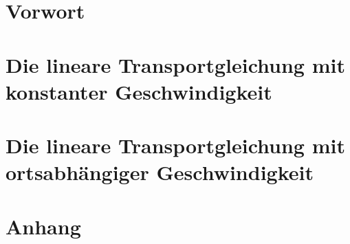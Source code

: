 \documentclass[a4paper
               ,11pt%
               ,openright%
               ,titlepage%
               ,twoside%
               ]{scrreprt}
\numberwithin{equation}{section}
\begin{document}

\pagestyle{empty}
\clearpage{}



\tableofcontents

\clearpage{}
\pagestyle{plain}
\setcounter{page}{1}

\chapter{Vorwort}

% 
\chapter{Die lineare Transportgleichung mit konstanter Geschwindigkeit}

\chapter{Die lineare Transportgleichung mit ortsabhängiger Geschwindigkeit}

% 



\appendix

\chapter{Anhang}


\end{document}
